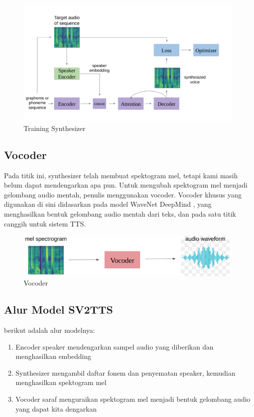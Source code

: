 \begin{figure}[H]
        \centerline{\includegraphics[scale=.35]{figures/train}}
        \caption{Training Synthesizer\cite{DBLP:journals/corr/abs-1806-04558}}
		\label{train}
\end{figure}

\subsection{Vocoder}
Pada titik ini, synthesizer telah membuat spektogram mel, tetapi kami masih belum dapat mendengarkan apa pun. Untuk mengubah spektogram mel menjadi gelombang audio mentah, penulis menggunakan vocoder.
Vocoder khusus yang digunakan di sini didasarkan pada model WaveNet DeepMind , yang menghasilkan bentuk gelombang audio mentah dari teks, dan pada satu titik canggih untuk sistem TTS\cite{DBLP:journals/corr/OordDZSVGKSK16}.
\begin{figure}[H]
        \centerline{\includegraphics[scale=.35]{figures/vocoder}}
        \caption{Vocoder\cite{DBLP:journals/corr/abs-1806-04558}}
		\label{vocoder}
\end{figure}


\subsection{Alur Model SV2TTS}
berikut adalah alur modelnya:
\begin{enumerate}
\item Encoder speaker mendengarkan sampel audio yang diberikan dan menghasilkan embedding
\item Synthesizer mengambil daftar fonem dan penyematan speaker, kemudian menghasilkan spektogram mel
\item Vocoder saraf menguraikan spektogram mel menjadi bentuk gelombang audio yang dapat kita dengarkan
\end{enumerate}

